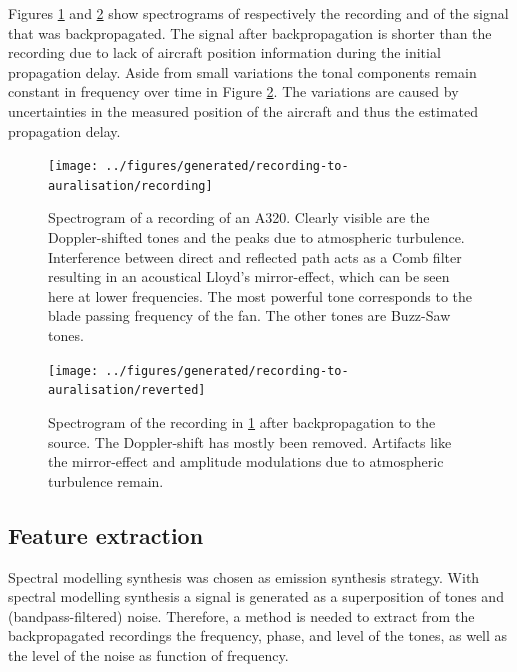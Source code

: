 Figures \ref{fig:recording} and \ref{fig:backpropagated} show spectrograms of
respectively the recording and of the signal that was backpropagated. The signal
after backpropagation is shorter than the recording due to lack of aircraft
position information during the initial propagation delay.
Aside from small variations the tonal components remain constant in frequency
over time in Figure \ref{fig:backpropagated}. The variations are caused
by uncertainties in the measured position of the aircraft and thus the estimated
propagation delay.


\begin{figure}[H]
  \centering
  \texttt{[image: ../figures/generated/recording-to-auralisation/recording]}
  \caption{
    Spectrogram of a recording of an A320. Clearly visible are the
    Doppler-shifted tones and the peaks due to atmospheric turbulence.
    Interference between direct and reflected path acts as a Comb filter resulting
    in an acoustical Lloyd's mirror-effect, which can be seen here at lower
    frequencies. The most powerful tone corresponds to the blade passing frequency
    of the fan. The other tones are Buzz-Saw tones.}
  \label{fig:recording}
\end{figure}

\begin{figure}[H]
  \centering
  \texttt{[image: ../figures/generated/recording-to-auralisation/reverted]}
  \caption{Spectrogram of the recording in \ref{fig:recording} after backpropagation to the source. The Doppler-shift has mostly been removed. Artifacts like the mirror-effect and amplitude modulations due to atmospheric turbulence remain.}
  \label{fig:backpropagated}
\end{figure}

\subsection{Feature extraction}
Spectral modelling synthesis was chosen as emission synthesis strategy. With
spectral modelling synthesis a signal is generated as a superposition of tones
and (bandpass-filtered) noise.
Therefore, a method is needed to extract from the backpropagated recordings the
frequency, phase, and level of the tones, as well as the level of the noise as
function of frequency.

